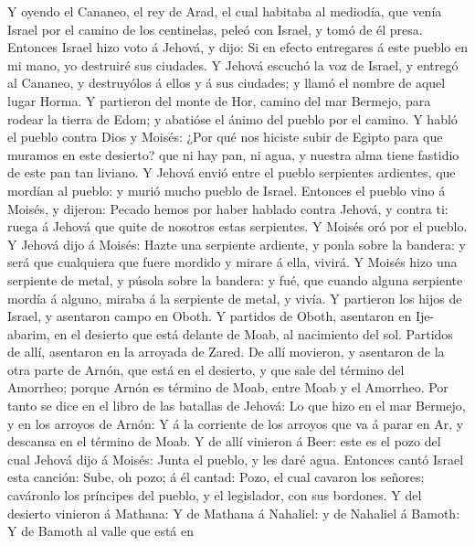  Y oyendo el Cananeo, el rey de Arad, el cual habitaba al
mediodía, que venía Israel por el camino de los centinelas, peleó con
Israel, y tomó de él presa.  Entonces Israel hizo voto á
Jehová, y dijo: Si en efecto entregares á este pueblo en mi mano, yo
destruiré sus ciudades.  Y Jehová escuchó la voz de Israel,
y entregó al Cananeo, y destruyólos á ellos y á sus ciudades; y llamó el
nombre de aquel lugar Horma.  Y partieron del monte de Hor,
camino del mar Bermejo, para rodear la tierra de Edom; y abatióse el
ánimo del pueblo por el camino.  Y habló el pueblo contra
Dios y Moisés: ¿Por qué nos hiciste subir de Egipto para que muramos en
este desierto? que ni hay pan, ni agua, y nuestra alma tiene fastidio de
este pan tan liviano.  Y Jehová envió entre el pueblo
serpientes ardientes, que mordían al pueblo: y murió mucho pueblo de
Israel.  Entonces el pueblo vino á Moisés, y dijeron: Pecado
hemos por haber hablado contra Jehová, y contra ti: ruega á Jehová que
quite de nosotros estas serpientes. Y Moisés oró por el pueblo.
 Y Jehová dijo á Moisés: Hazte una serpiente ardiente, y
ponla sobre la bandera: y será que cualquiera que fuere mordido y mirare
á ella, vivirá.  Y Moisés hizo una serpiente de metal, y
púsola sobre la bandera: y fué, que cuando alguna serpiente mordía á
alguno, miraba á la serpiente de metal, y vivía.  Y
partieron los hijos de Israel, y asentaron campo en Oboth. 
Y partidos de Oboth, asentaron en Ije-abarim, en el desierto que está
delante de Moab, al nacimiento del sol.  Partidos de allí,
asentaron en la arroyada de Zared.  De allí movieron, y
asentaron de la otra parte de Arnón, que está en el desierto, y que sale
del término del Amorrheo; porque Arnón es término de Moab, entre Moab y
el Amorrheo.  Por tanto se dice en el libro de las batallas
de Jehová: Lo que hizo en el mar Bermejo, y en los arroyos de Arnón:
 Y á la corriente de los arroyos que va á parar en Ar, y
descansa en el término de Moab.  Y de allí vinieron á Beer:
este es el pozo del cual Jehová dijo á Moisés: Junta el pueblo, y les
daré agua.  Entonces cantó Israel esta canción: Sube, oh
pozo; á él cantad:  Pozo, el cual cavaron los señores;
caváronlo los príncipes del pueblo, y el legislador, con sus bordones. Y
del desierto vinieron á Mathana:  Y de Mathana á Nahaliel:
y de Nahaliel á Bamoth:  Y de Bamoth al valle que está en
